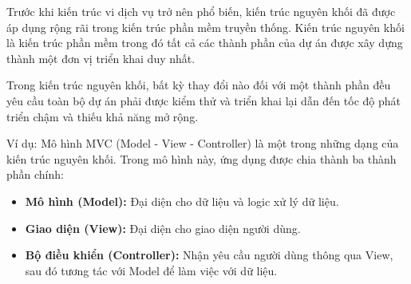 
Trước khi kiến trúc vi dịch vụ trở nên phổ biến, kiến trúc nguyên khối đã được áp dụng rộng rãi trong kiến trúc phần mềm truyền thống. Kiến trúc nguyên khối là kiến trúc phần mềm trong đó tất cả các thành phần của dự án được xây dựng thành một đơn vị triển khai duy nhất.

Trong kiến trúc nguyên khối, bất kỳ thay đổi nào đối với một thành phần đều yêu cầu toàn bộ dự án phải được kiểm thử và triển khai lại dẫn đến tốc độ phát triển chậm và thiếu khả năng mở rộng.

Ví dụ: Mô hình MVC (Model - View - Controller) là một trong những dạng của kiến trúc nguyên khối. Trong mô hình này, ứng dụng được chia thành ba thành phần chính:

\begin{itemize}


 





\item \textbf{Mô hình (Model):}        Đại diện cho dữ liệu và logic xử lý dữ liệu.

\item \textbf{Giao diện (View):}        Đại diện cho giao diện người dùng.

\item \textbf{Bộ điều khiển (Controller):}        Nhận yêu cầu người dùng thông qua View, sau đó tương tác với Model để làm việc với dữ liệu.

\end{itemize}